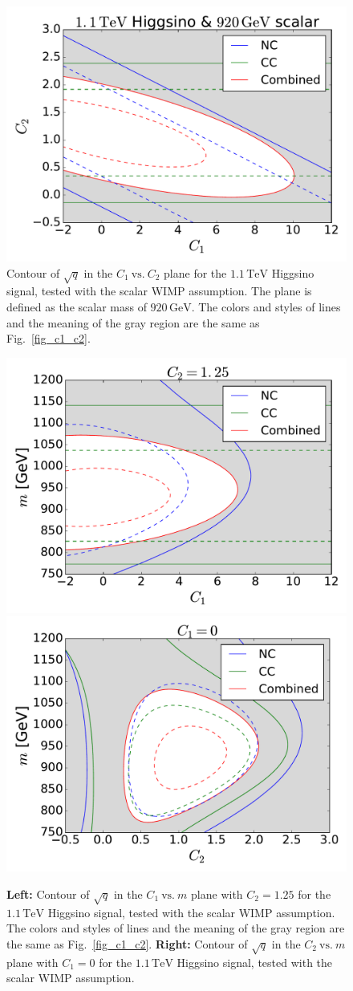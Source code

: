 \documentclass[12pt,twoside,book]{article}
\begin{document}
\begin{figure}[t]
 \centering
 \includegraphics[width=0.5\linewidth]{C1_vs_C2_Higgsino_scalar.pdf}
 \caption{Contour of $\sqrt{q}$ in the $C_1~\mathrm{vs.}~C_2$ plane for
 the $1.1\,\mathrm{TeV}$ Higgsino signal, tested with the scalar WIMP
 assumption.  The plane is defined as the scalar mass of $920\,\mathrm{GeV}$.
 The colors and styles of lines and the meaning of the gray region are
 the same as Fig.~\ref{fig_c1_c2}.}  \label{fig_c1_c2_scalar}
\end{figure}

\begin{figure}[t]
 \centering
 \includegraphics[width=0.48\linewidth]{C1_vs_mass_Higgsino_scalar.pdf}
 \includegraphics[width=0.48\linewidth]{C2_vs_mass_Higgsino_scalar.pdf}
 \caption{\textbf{Left:} Contour of $\sqrt{q}$ in the
 $C_1~\mathrm{vs.}~m$ plane with $C_2 = 1.25$ for the $1.1\,\mathrm{TeV}$ Higgsino signal,
 tested with the scalar WIMP assumption.
 The colors and styles of lines and the meaning of the gray
 region are the same as Fig.~\ref{fig_c1_c2}.  \textbf{Right:} Contour
 of $\sqrt{q}$ in the $C_2~\mathrm{vs.}~m$ plane with $C_1 = 0$ for the
 $1.1\,\mathrm{TeV}$ Higgsino signal, tested with the scalar WIMP
 assumption.} \label{fig_c1_m_scalar}
\end{figure}
\end{document}
